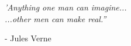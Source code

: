 \clearpage
\pagestyle{empty}  %

\null\vfill\vfill



\textit{
    'Anything one man can imagine... \\
    ...other men can make real.''
}
\begin{flushright}
    - Jules Verne
\end{flushright}


 
\vfill\vfill\vfill\vfill\vfill\null
